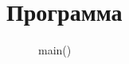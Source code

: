 \documentclass[12pt, a4paper]{article}
\begin{document}
\renewcommand{\contentsname}{Содержание}
\tableofcontents
\newpage

\section{Программа}


\begin{figure}[H]
    \caption{main()}
\end{figure}

\end{document}
